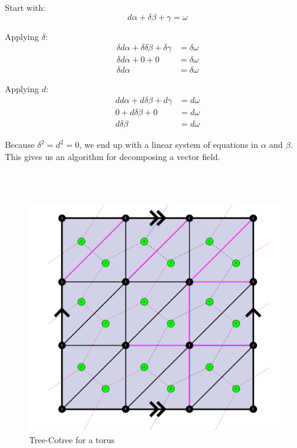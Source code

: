 \documentclass{article}
\begin{document}
\vspace{1.8cm}
\\\\


Start with:
$$
    d\alpha + \delta\beta + \gamma = \omega
$$

Applying $\delta$:
\begin{align*}
    \delta d\alpha + \delta\delta\beta + \delta\gamma &= \delta\omega \\
    \delta d\alpha + 0 + 0 &= \delta\omega \\
    \delta d\alpha &= \delta\omega
\end{align*}

Applying $d$:
\begin{align*}
    dd\alpha + d\delta\beta + d\gamma &= d\omega \\
    0 + d\delta\beta + 0 &= d\omega \\
    d\delta\beta &= d\omega
\end{align*}

Because $\delta^2 = d^2 = 0$, we end up with a linear system of equations in $\alpha$ and $\beta$.
This gives us an algorithm for decomposing a vector field.


\vspace{1.8cm}
\\\\


\begin{figure}[h]
    \centering
    \includegraphics[width=\textwidth]{figs/torus_tree_cotree.pdf}
    \caption{Tree-Cotree for a torus}
\end{figure}
\end{document}
